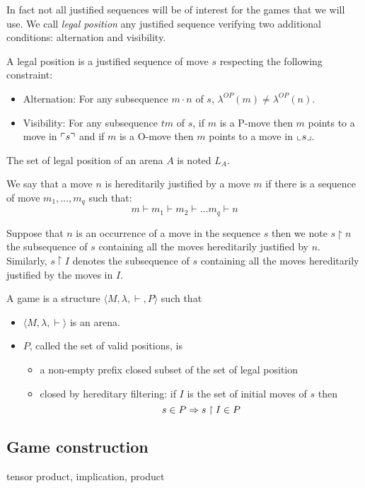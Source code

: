 In fact not all justified sequences will be of interest for the games that we will use.
We call \emph{legal position} any justified sequence
verifying two additional conditions: alternation and visibility.

\begin{dfn}
A legal position is a justified sequence of move $s$ respecting the following constraint:
\begin{itemize}
\item Alternation: For any subsequence $m \cdot n$ of $s$, $\lambda^{OP}(m) \neq \lambda^{OP}(n)$.
\item Visibility: For any subsequence $t m$ of $s$, if $m$ is a P-move then $m$ points to a move in $\ulcorner s \urcorner$
and if $m$ is a O-move then $m$ points to a move in $\llcorner s \lrcorner$.
\end{itemize}

The set of legal position of an arena $A$ is noted $L_A$.
\end{dfn}

We say that a move $n$ is hereditarily justified by a move $m$ if there is a sequence of move
$m_1, \ldots, m_q$ such that:
$$ m \vdash m_1 \vdash m_2 \vdash \ldots m_q \vdash n$$

Suppose that $n$ is an occurrence of a move in the sequence $s$ then we note
$s \upharpoonright n$ the subsequence of $s$ containing all the moves hereditarily justified by $n$.
Similarly, $s \upharpoonright I$ denotes the
subsequence of $s$ containing all the moves hereditarily justified by the moves in $I$.

\begin{dfn}[Game]
A game is a structure $\langle M, \lambda, \vdash, P \rangle$ such that
\begin{itemize}
\item $ \langle M, \lambda, \vdash \rangle$ is an arena.
\item $P$, called the set of valid positions, is
    \begin{itemize}
    \item a non-empty prefix closed subset of the set of legal position
    \item closed by hereditary filtering: if $I$ is the set of initial moves of $s$ then
        $$ s \in P \Rightarrow s\upharpoonright I \in P$$
    \end{itemize}
\end{itemize}
\end{dfn}

\subsection{Game construction}
tensor product, implication, product

